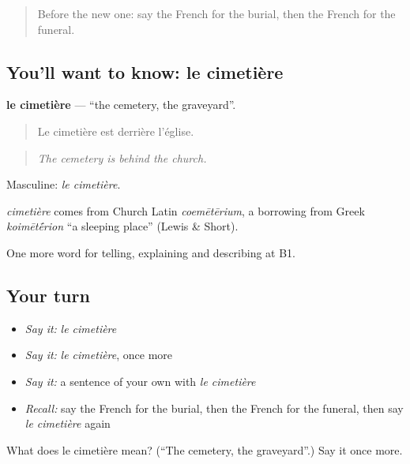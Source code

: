 \label{lesson:FR-C314-cimetiere}



\begin{quote}
Before the new one: say the French for the burial, then the French for the funeral.
\end{quote}

\subsection*{You'll want to know: le cimetière}
\textbf{le cimetière} — \textquotedblleft{}the cemetery, the graveyard\textquotedblright{}.

\begin{quote}
Le cimetière est derrière l'église.
\end{quote}

\begin{quote}
\emph{The cemetery is behind the church.}
\end{quote}

Masculine: \emph{le cimetière}.

\begin{cousinweb}
\emph{cimetière} comes from Church Latin \emph{coemētērium}, a borrowing from Greek \emph{koimēt\'{\={e}}rion} \textquotedblleft{}a sleeping place\textquotedblright{} (Lewis \& Short).
\end{cousinweb}

\begin{grammarlens}[title={What you've built}]
One more word for telling, explaining and describing at B1.
\end{grammarlens}

\subsection*{Your turn}
\begin{itemize}
\raggedright
  \item \emph{Say it:} \emph{le cimetière}
  \item \emph{Say it:} \emph{le cimetière}, once more
  \item \emph{Say it:} a sentence of your own with \emph{le cimetière}
  \item \emph{Recall:} say the French for the burial, then the French for the funeral, then say \emph{le cimetière} again
\end{itemize}

\begin{tcolorbox}[breakable,colback=teal!4,colframe=teal!35!black,title={Before you move on}]
What does le cimetière mean? (\textquotedblleft{}The cemetery, the graveyard\textquotedblright{}.) Say it once more.
\end{tcolorbox}
